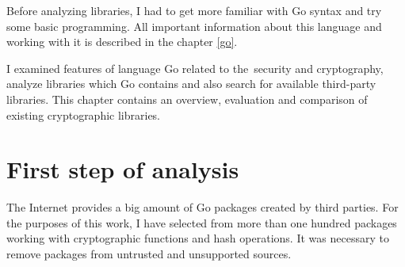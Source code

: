\documentclass[
  12pt, 
  digital, %
  notable,   %
  nolof,     %
  nolot,     %
]{fithesis3}
\begin{document}
Before analyzing libraries, I had to get more familiar with Go syntax and try some basic 
programming. All important information about this language and working with it is described in the chapter \ref{go}. 

I examined features of language Go related to the~security and cryptography, analyze libraries 
which Go contains and also search for available third-party libraries. This chapter contains an overview, evaluation and comparison of existing cryptographic libraries.

\section{First step of analysis}

The Internet provides a big amount of Go packages created by third parties. For the purposes of this 
work, I have selected from more than one hundred packages working with cryptographic functions and hash 
operations. It was necessary to remove packages from untrusted and unsupported sources. 
\end{document}

